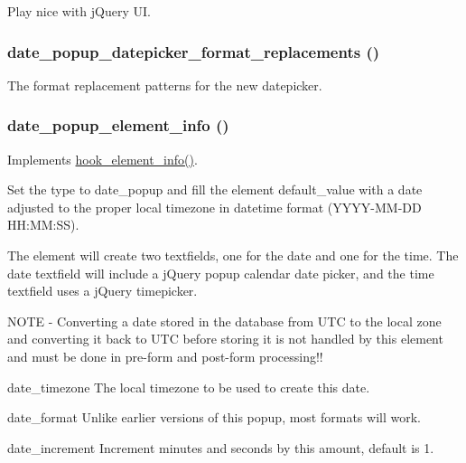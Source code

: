 Play nice with jQuery UI. \hypertarget{date__popup_8module_afe02f13cab50570420caf4d3f0a6d824}{
\subsubsection[{date\_\-popup\_\-datepicker\_\-format\_\-replacements}]{\setlength{\rightskip}{0pt plus 5cm}date\_\-popup\_\-datepicker\_\-format\_\-replacements ()}}
\label{date__popup_8module_afe02f13cab50570420caf4d3f0a6d824}
The format replacement patterns for the new datepicker. \hypertarget{date__popup_8module_a0ba42c20b0a9b00949c0d480f2f67fb7}{
\subsubsection[{date\_\-popup\_\-element\_\-info}]{\setlength{\rightskip}{0pt plus 5cm}date\_\-popup\_\-element\_\-info ()}}
\label{date__popup_8module_a0ba42c20b0a9b00949c0d480f2f67fb7}
Implements \hyperlink{group__hooks_ga3c5182432eddc82f8b7845e66a365d51}{hook\_\-element\_\-info()}.

Set the type to date\_\-popup and fill the element default\_\-value with a date adjusted to the proper local timezone in datetime format (YYYY-\/MM-\/DD HH:MM:SS).

The element will create two textfields, one for the date and one for the time. The date textfield will include a jQuery popup calendar date picker, and the time textfield uses a jQuery timepicker.

NOTE -\/ Converting a date stored in the database from UTC to the local zone and converting it back to UTC before storing it is not handled by this element and must be done in pre-\/form and post-\/form processing!!

date\_\-timezone The local timezone to be used to create this date.

date\_\-format Unlike earlier versions of this popup, most formats will work.

date\_\-increment Increment minutes and seconds by this amount, default is 1.

